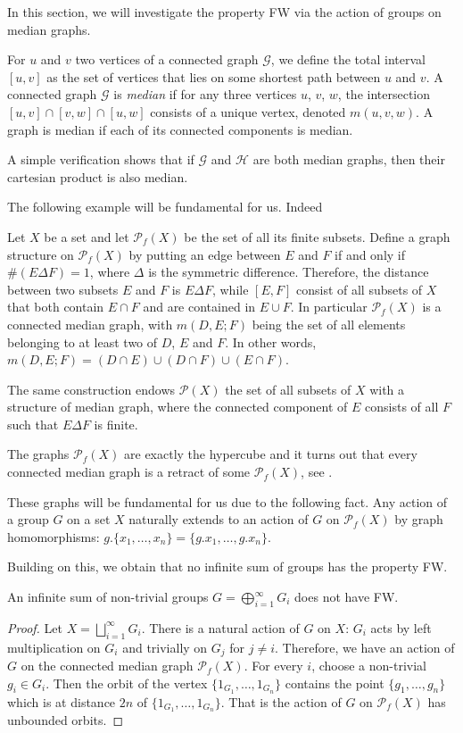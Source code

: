 In this section, we will investigate the property FW via the action of groups on median graphs.

For $u$ and $v$ two vertices of a connected graph $\mathcal G$, we define the total interval $[u,v]$ as the set of vertices that lies on some shortest path between $u$ and $v$.
A connected graph $\mathcal G$ is \emph{median} if for any three vertices $u$, $v$, $w$, the intersection $[u,v]\cap[v,w]\cap[u,w]$ consists of a unique vertex, denoted $m(u,v,w)$.
A graph is median if each of its connected components is median.

A simple verification shows that if $\mathcal G$ and $\mathcal H$ are both median graphs, then their cartesian product is also median.

The following example will be fundamental for us. Indeed
\begin{exmp}
Let $X$ be a set and let  $\mathcal P_f(X)$ be the set of all its finite subsets.
Define a graph structure on $\mathcal P_f(X)$ by putting an edge between $E$ and $F$ if and only if $\#(E\Delta F)=1$, where $\Delta$ is the symmetric difference.
Therefore, the distance between two subsets $E$ and $F$ is $E\Delta F$, while $[E,F]$ consist of all subsets of $X$ that both contain $E\cap F$ and are contained in $E\cup F$.
In particular $\mathcal P_f(X)$ is a connected median graph, with $m(D,E;F)$ being the set of all elements belonging to at least two of $D$, $E$ and $F$. In other words,
$m(D,E;F)=(D\cap E)\cup(D\cap F)\cup(E\cap F)$.

The same construction endows $\mathcal P(X)$ the set of all subsets of $X$ with a structure of median graph, where the connected component of $E$ consists of all $F$ such that $E\Delta F$ is finite.
\end{exmp}

The graphs $\mathcal P_f(X)$ are exactly the hypercube and it turns out that every connected median graph is a retract of some $\mathcal P_f(X)$, see \cite{Bandelt1984}.

These graphs will be fundamental for us due to the following fact.
Any action of a group $G$ on a set $X$ naturally extends to an action of $G$ on $\mathcal P_f(X)$ by graph homomorphisms: $g.\{x_1,\dots,x_n\}=\{g.x_1,\dots,g.x_n\}$.


Building on this, we obtain that no infinite sum of groups has the property FW.
\begin{lem}\label{Lemma:Sum}
An infinite sum of non-trivial groups $G=\bigoplus_{i=1}^\infty G_i$ does not have FW.
\end{lem}
\begin{proof}
Let $X=\bigsqcup_{i=1}^\infty G_i$.
There is a natural action of $G$ on $X$: $G_i$ acts by left multiplication on $G_i$ and trivially on $G_j$ for $j\neq i$.
Therefore, we have an action of $G$ on the connected median graph $\mathcal P_f(X)$.
For every $i$, choose a non-trivial $g_i\in G_i$.
Then the orbit of the vertex $\{1_{G_1},\dots, 1_{G_n}\}$ contains the point $\{g_1,\dots, g_n\}$ which is at distance $2n$ of $\{1_{G_1},\dots, 1_{G_n}\}$.
That is the action of $G$ on $\mathcal P_f(X)$ has unbounded orbits.
\end{proof}

